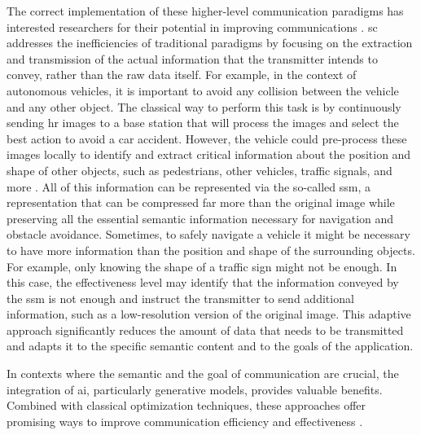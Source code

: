 The correct implementation of these higher-level communication paradigms has interested researchers for their potential in improving communications \cite{Strinati20216G, Han2022SemanticPreserved, Gunduz2023Beyond, Qin2021Semantic, Lu2021Rethinking}. \gls{sc} addresses the inefficiencies of traditional paradigms by focusing on the extraction and transmission of the actual information that the transmitter intends to convey, rather than the raw data itself. For example, in the context of autonomous vehicles, it is important to avoid any collision between the vehicle and any other object. The classical way to perform this task is by continuously sending \gls{hr} images to a base station that will process the images and select the best action to avoid a car accident. However, the vehicle could pre-process these images locally to identify and extract critical information about the position and shape of other objects, such as pedestrians, other vehicles, traffic signals, and more \cite{Grigorescu2020survey}. All of this information can be represented via the so-called \gls{ssm}, a representation that can be compressed far more than the original image while preserving all the essential semantic information necessary for navigation and obstacle avoidance. Sometimes, to safely navigate a vehicle it might be necessary to have more information than the position and shape of the surrounding objects. For example, only knowing the shape of a traffic sign might not be enough. In this case, the effectiveness level may identify that the information conveyed by the \gls{ssm} is not enough and instruct the transmitter to send additional information, such as a low-resolution version of the original image. This adaptive approach significantly reduces the amount of data that needs to be transmitted and adapts it to the specific semantic content and to the goals of the application.

In contexts where the semantic and the goal of communication are crucial, the integration of \gls{ai}, particularly generative models, provides valuable benefits. Combined with classical optimization techniques, these approaches offer promising ways to improve communication efficiency and effectiveness \cite{Xie2021DeepLearningEnabled}.


